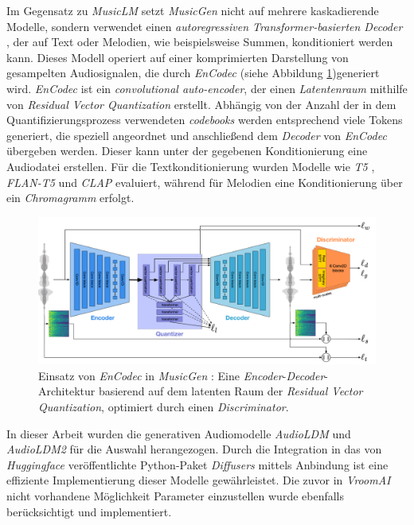 \documentclass[
  a4paper,  %
  twoside,  %
  bibliography=totoc,
  headsepline,
  cleardoublepage=empty,
  parskip=half,
  draft=false
]{scrbook}
\begin{document}
Im Gegensatz zu \emph{MusicLM} \cite{copet_simple_2023} setzt \emph{MusicGen} nicht auf mehrere kaskadierende Modelle, sondern verwendet einen \emph{autoregressiven Transformer-basierten Decoder} \cite{vaswani_attention_2017}, der auf Text oder Melodien, wie beispielsweise Summen, konditioniert werden kann. Dieses Modell operiert auf einer komprimierten Darstellung von gesampelten Audiosignalen, die durch \emph{EnCodec} \cite{defossez_high_2022} (siehe Abbildung \ref{fig:encodec})generiert wird. \emph{EnCodec} ist ein \emph{convolutional auto-encoder}, der einen \emph{Latentenraum} mithilfe von \emph{Residual Vector Quantization} \cite{zeghidour_soundstream_2021} erstellt. Abhängig von der Anzahl der in dem Quantifizierungsprozess verwendeten \emph{codebooks} werden entsprechend viele Tokens generiert, die speziell angeordnet und anschließend dem \emph{Decoder} von \emph{EnCodec} übergeben werden. Dieser kann unter der gegebenen Konditionierung eine Audiodatei erstellen. Für die Textkonditionierung wurden Modelle wie \emph{T5} \cite{raffel_exploring_2020}, \emph{FLAN-T5} \cite{roberts_scaling_2022} und \emph{CLAP} evaluiert, während für Melodien eine Konditionierung über ein \emph{Chromagramm} erfolgt. \cite{copet_simple_2023}

\begin{figure}[h]
  \centering
  \includegraphics[width=.7\textwidth]{graphics/MusicGen.png}
  \caption[MusicGen EnCodec]{Einsatz von \emph{EnCodec} \cite{defossez_high_2022} in \emph{MusicGen} \cite{copet_simple_2023}: Eine \emph{Encoder}-\emph{Decoder}-Architektur basierend auf dem latenten Raum der \emph{Residual Vector Quantization}, optimiert durch einen \emph{Discriminator}. \cite{defossez_high_2022}}
  \label{fig:encodec}
\end{figure}

In dieser Arbeit wurden die generativen Audiomodelle \emph{AudioLDM} \cite{liu_audioldm_2023} und \emph{AudioLDM2} \cite{liu_audioldm2_2023} für die Auswahl herangezogen. Durch die Integration in das von \emph{Huggingface} \cite{noauthor_hugging_2023} veröffentlichte Python-Paket \emph{Diffusers} \cite{von_platen_diffusers_2023} mittels Anbindung \cite{noauthor_huggingface-audioldm_nodate, noauthor_huggingface-audioldm2_nodate} ist eine effiziente Implementierung dieser Modelle gewährleistet. Die zuvor in \emph{VroomAI} nicht vorhandene Möglichkeit Parameter einzustellen wurde ebenfalls berücksichtigt und implementiert.
\end{document}
